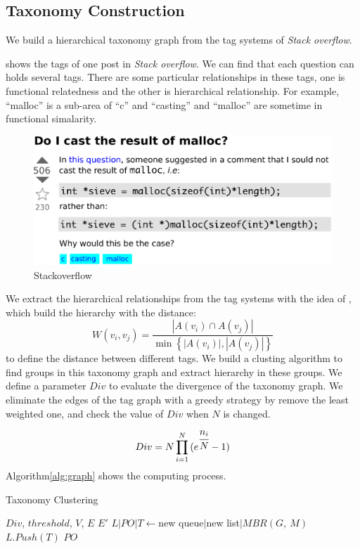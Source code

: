 \subsection{Taxonomy Construction}
\label{sec:constr}

We build a hierarchical taxonomy graph from the tag systems of {\it Stack overflow}.

 shows the tags of one post in {\it Stack overflow}. We can find 
that each question can holds several tags. There are some particular relationships 
in these tags, one is functional relatedness and the other is hierarchical relationship.
For example, ``malloc'' is a sub-area of ``c'' and ``casting'' and ``malloc''
are sometime in functional simalarity. 
\\
\begin{figure}[!h]
\begin{center}
\includegraphics[width=\columnwidth]{figure/stackoverflow.eps}
\caption{Stackoverflow}
\label{fig:sof}
\end{center}
\end{figure}

We extract the hierarchical relationships from the tag systems with the idea of
\cite{tag}, which build the hierarchy with the distance: 
\[W(v_i, v_j)=\frac{|A(v_i)\cap A(v_j)|}{\min\left\{|A(v_i)|, |A(v_j)|\right\}}\]
to define the distance between different tags.
We build a clusting algorithm to find groups in this taxonomy graph and extract
hierarchy in these groups. We define a parameter $Div$ to evaluate the divergence
of the taxonomy graph. We eliminate the edges of the tag graph with a greedy 
strategy by remove the least weighted one, and check the value of $Div$ when
$N$ is changed.
\[Div = N \prod _{i=1}^{N}{(e^{\cfrac { n_i }{ N }}-1)}\]
Algorithm\ref{alg:graph} shows the computing process.
\begin{algorithm}
\caption{Taxonomy Clustering}
\label{alg:graph}
\begin{algorithmic}[1]
\Require $Div$, $threshold$, $V$, $E$
\Ensure $E'$
\State $L|PO|T\leftarrow$new queue$|$new list$|MBR(G,~M)$
\State $L.Push(T)$
\Return $PO$
\EndFunction
\end{algorithmic}
\end{algorithm}

